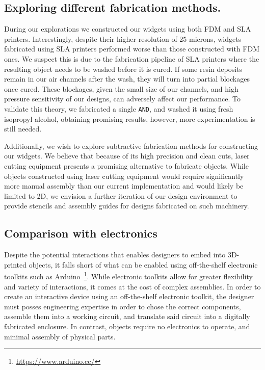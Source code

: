       \subsection{Exploring different fabrication methods.} 
        During our explorations we constructed our widgets using both FDM
        and SLA printers. Interestingly, despite their higher resolution of
        25 microns, widgets fabricated using SLA printers performed worse
        than those constructed with FDM ones. We suspect this is due to the
        fabrication pipeline of SLA printers where the resulting object
        needs to be washed before it is cured. If some resin deposits remain in
        our air channels after the wash, they will turn into partial
        blockages once cured. These blockages, given the small size of our
        channels, and high pressure sensitivity of our designs, can
        adversely affect our performance. To validate this theory, we
        fabricated a single \texttt{AND}, and washed it using fresh
        isopropyl alcohol, obtaining promising results, however, more
        experimentation is still needed.

        Additionally, we wish to explore subtractive fabrication methods for
        constructing our widgets. We believe that because of its high precision
        and clean cuts, laser cutting equipment presents a promising alternative
        to fabricate \al objects. While \al objects constructed using laser
        cutting equipment would require significantly more manual assembly than
        our current implementation and would likely be limited to 2D, we
        envision a further iteration of our design environment to provide
        stencils and assembly guides for \al designs fabricated on such
        machinery.
        
      \subsection{Comparison with electronics}
        Despite the potential interactions that \al enables designers to
        embed into 3D-printed objects, it falls short of what can be
        enabled using off-the-shelf electronic toolkits such as
        Arduino~\footnote{\url{https://www.arduino.cc/}}. While electronic
        toolkits allow for greater flexibility and variety of interactions,
        it comes at the cost of complex assemblies. In order to create an
        interactive device using an off-the-shelf electronic toolkit, the
        designer must posses engineering expertise in order to chose the
        correct components, assemble them into a working circuit, and
        translate said circuit into a digitally fabricated enclosure. In
        contrast, \al objects require no electronics to operate, and
        minimal assembly of physical parts.
        
